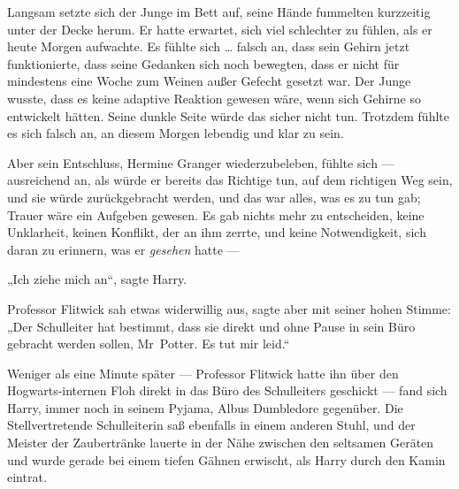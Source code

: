 Langsam setzte sich der Junge im Bett auf, seine Hände fummelten kurzzeitig unter der Decke herum. Er hatte erwartet, sich viel schlechter zu fühlen, als er heute Morgen aufwachte. Es fühlte sich … falsch an, dass sein Gehirn jetzt funktionierte, dass seine Gedanken sich noch bewegten, dass er nicht für mindestens eine Woche zum Weinen außer Gefecht gesetzt war. Der Junge wusste, dass es keine adaptive Reaktion gewesen wäre, wenn sich Gehirne so entwickelt hätten. Seine dunkle Seite würde das sicher nicht tun. Trotzdem fühlte es sich falsch an, an diesem Morgen lebendig und klar zu sein.

Aber sein Entschluss, Hermine Granger wiederzubeleben, fühlte sich — ausreichend an, als würde er bereits das Richtige tun, auf dem richtigen Weg sein, und sie würde zurückgebracht werden, und das war alles, was es zu tun gab; Trauer wäre ein Aufgeben gewesen. Es gab nichts mehr zu entscheiden, keine Unklarheit, keinen Konflikt, der an ihm zerrte, und keine Notwendigkeit, sich daran zu erinnern, was er \emph{gesehen} hatte —

„Ich ziehe mich an“, sagte Harry.

Professor Flitwick sah etwas widerwillig aus, sagte aber mit seiner hohen Stimme:
„Der Schulleiter hat bestimmt, dass sie direkt und ohne Pause in sein Büro gebracht werden sollen, Mr~Potter. Es tut mir leid.“

Weniger als eine Minute später — Professor Flitwick hatte ihn über den Hogwarts-internen Floh direkt in das Büro des Schulleiters geschickt — fand sich Harry, immer noch in seinem Pyjama, Albus Dumbledore gegenüber. Die Stellvertretende Schulleiterin saß ebenfalls in einem anderen Stuhl, und der Meister der Zaubertränke lauerte in der Nähe zwischen den seltsamen Geräten und wurde gerade bei einem tiefen Gähnen erwischt, als Harry durch den Kamin eintrat.


